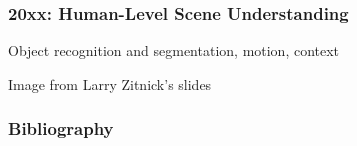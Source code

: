 \documentclass[xetex,professionalfont]{beamer}
\begin{document}

\begin{frame}
\frametitle{20xx: Human-Level Scene Understanding}

Object recognition and segmentation, motion, context

\bigskip
\begin{center}
	{\centering Image from Larry Zitnick's slides}
\end{center}

\end{frame}


\begin{frame}[allowframebreaks=0.9]
\frametitle{Bibliography}

\printbibliography

\end{frame}
\end{document}
